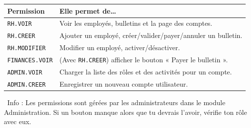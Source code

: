 \documentclass[12pt,a4paper]{article}
\newcommand{\info}[1]{\par\noindent\textcolor{lagoon}{\faInfoCircle\ Info : #1}\par}
\begin{document}
\begin{center}
\begin{tabular}{ll}
  \toprule
  \textbf{Permission} & \textbf{Elle permet de\ldots} \\
  \midrule
  \texttt{RH.VOIR} & Voir les employés, bulletins et la page des comptes. \\
  \texttt{RH.CREER} & Ajouter un employé, créer/valider/payer/annuler un bulletin. \\
  \texttt{RH.MODIFIER} & Modifier un employé, activer/désactiver. \\
  \texttt{FINANCES.VOIR} & (Avec \texttt{RH.CREER}) afficher le bouton « Payer le bulletin ». \\
  \texttt{ADMIN.VOIR} & Charger la liste des rôles et des activités pour un compte. \\
  \texttt{ADMIN.CREER} & Enregistrer un nouveau compte utilisateur. \\
  \bottomrule
\end{tabular}
\end{center}

\info{Les permissions sont gérées par les administrateurs dans le module Administration. Si un bouton manque alors que tu devrais l'avoir, vérifie ton rôle avec eux.}

\vspace{1cm}
\begin{center}
\end{center}
\end{document}
